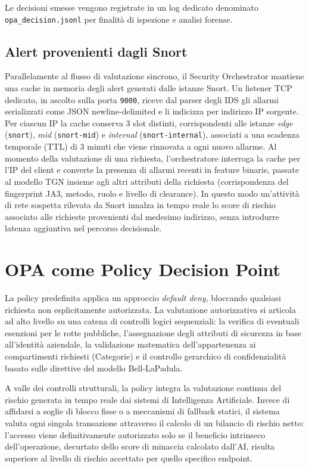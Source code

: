 Le decisioni emesse vengono registrate in un log dedicato denominato \texttt{opa\_decision.jsonl} per finalità di ispezione e analisi forense.

\subsection{Alert provenienti dagli Snort}

  Parallelamente al flusso di valutazione sincrono, il Security Orchestrator mantiene una cache
  in memoria degli alert generati dalle istanze Snort. Un listener TCP dedicato, in ascolto
  sulla porta \texttt{9000}, riceve dal parser degli IDS gli allarmi serializzati come JSON
  newline-delimited e li indicizza per indirizzo IP sorgente. Per ciascun IP la cache conserva
  3 slot distinti, corrispondenti alle istanze \textit{edge} (\texttt{snort}), \textit{mid}
  (\texttt{snort-mid}) e \textit{internal} (\texttt{snort-internal}), associati a una scadenza
  temporale (TTL) di 3 minuti che viene rinnovata a ogni nuovo allarme. Al momento della
  valutazione di una richiesta, l'orchestratore interroga la cache per l'IP del client e
  converte la presenza di allarmi recenti in feature binarie, passate al modello TGN insieme
  agli altri attributi della richiesta (corrispondenza del fingerprint JA3, metodo, ruolo e
  livello di clearance). In questo modo un'attività di rete sospetta rilevata da Snort innalza
  in tempo reale lo score di rischio associato alle richieste provenienti dal medesimo
  indirizzo, senza introdurre latenza aggiuntiva nel percorso decisionale.

\section{OPA come Policy Decision Point}

La policy predefinita applica un approccio \textit{default deny}, bloccando qualsiasi richiesta non esplicitamente autorizzata. La valutazione autorizzativa si articola ad alto livello su una catena di controlli logici sequenziali: la verifica di eventuali esenzioni per le rotte pubbliche, l'assegnazione degli attributi di sicurezza in base all'identità aziendale, la validazione matematica dell'appartenenza ai compartimenti richiesti (Categorie) e il controllo gerarchico di confidenzialità basato sulle direttive del modello Bell-LaPadula.

A valle dei controlli strutturali, la policy integra la valutazione continua del rischio generata in tempo reale dai sistemi di Intelligenza Artificiale. Invece di affidarsi a soglie di blocco fisse o a meccanismi di fallback statici, il sistema valuta ogni singola transazione attraverso il calcolo di un bilancio di rischio netto: l'accesso viene definitivamente autorizzato solo se il beneficio intrinseco dell'operazione, decurtato dello score di minaccia calcolato dall'AI, risulta superiore al livello di rischio accettato per quello specifico endpoint.


